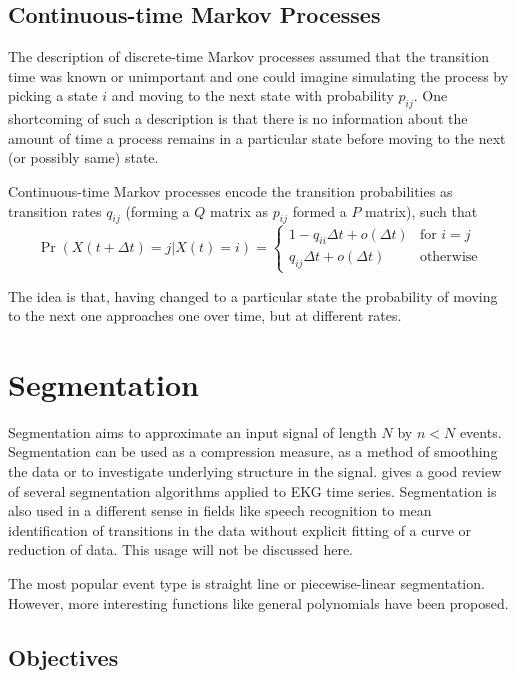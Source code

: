 \subsection{Continuous-time Markov Processes}
The description of discrete-time Markov processes assumed that the
transition time was known or unimportant and one could imagine
simulating the process by picking a state $i$ and moving to the next
state with probability $p_{ij}$.  One shortcoming of such a
description is that there is no information about the amount of time a
process remains in a particular state before moving to the next (or
possibly same) state.  

Continuous-time Markov processes encode the transition probabilities as
transition rates $q_{ij}$ (forming a $Q$ matrix as $p_{ij}$ formed a
$P$ matrix), such that
\begin{equation}
  \label{eq:contmarkov}
  \Pr(X(t+\Delta t) = j | X(t) = i) = 
  \begin{cases}
    1 - q_{ii}\Delta t + o(\Delta t) & \text{for } i = j \\
    q_{ij}\Delta t + o(\Delta t) & \text{otherwise}
  \end{cases}
\end{equation}

The idea is that, having changed to a particular state the probability of moving to the next one approaches one over time, but at different rates.

\section{Segmentation}
Segmentation aims to approximate an input signal of length $N$ by
$n<N$ events. Segmentation can be used as a compression measure, as a
method of smoothing the data or to investigate underlying structure in
the signal. \citet{keogh_segmenting_1993} gives a good review of
several segmentation algorithms applied to EKG time series.
Segmentation is also used in a different sense in fields like speech
recognition to mean identification of transitions in the data without
explicit fitting of a curve or reduction of data. This usage will not
be discussed here.

The most popular event type is straight line or piecewise-linear
segmentation.  However, more interesting functions like general
polynomials \citep{arora_fitting_2003} have been proposed.

\subsection{Objectives}
\label{sec:objectives}


